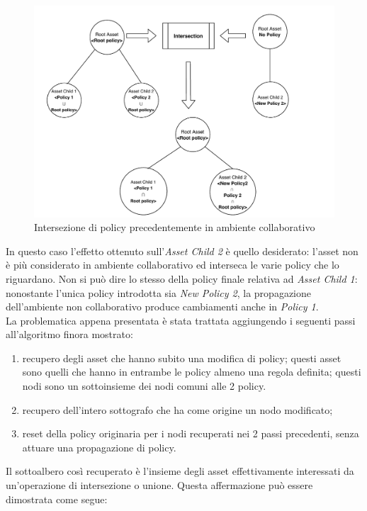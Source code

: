 \documentclass[12pt,a4paper,twoside]{book}
\begin{document}
\begin{figure}[H]
\centering
\includegraphics[scale=.60]{../immagini/wrongProp.pdf}
\caption{Intersezione di policy precedentemente in ambiente collaborativo}
\label{wrongProp}
\end{figure}
In questo caso l'effetto ottenuto sull'\textit{Asset Child 2} è quello desiderato: l'asset non è più considerato in ambiente collaborativo ed interseca le varie policy che lo riguardano. Non si può dire lo stesso della policy finale relativa ad \textit{Asset Child 1}: nonostante l'unica policy introdotta sia \textit{New Policy 2}, la propagazione dell'ambiente non collaborativo produce cambiamenti anche in \textit{Policy 1}.\\
La problematica appena presentata è stata trattata aggiungendo i seguenti passi all'algoritmo finora mostrato:
\begin{enumerate}
\item recupero degli asset che hanno subito una modifica di policy; questi asset sono quelli che hanno in entrambe le policy almeno una regola definita; questi nodi sono un sottoinsieme dei nodi comuni alle 2 policy.
\item recupero dell'intero sottografo che ha come origine un nodo modificato;
\item reset della policy originaria per i nodi recuperati nei 2 passi precedenti, senza attuare una propagazione di policy.
\end{enumerate}
Il sottoalbero così recuperato è l'insieme degli asset effettivamente interessati da un'operazione di intersezione o unione. Questa affermazione può essere dimostrata come segue:
\end{document}
